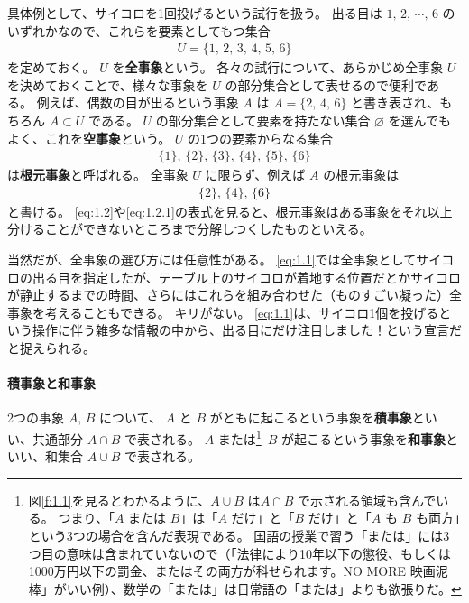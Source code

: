 \documentclass[12pt]{ltjsarticle}\usepackage{ifthen}\newcounter{enlarge}\setcounter{enlarge}{1}
\begin{document}
具体例として、サイコロを1回投げるという試行を扱う。
出る目は $1,\, 2,\, \cdots ,\, 6$ のいずれかなので、これらを要素としてもつ集合
\begin{align}
  U = \{ 1,\, 2,\, 3,\, 4,\, 5,\, 6 \} \label{eq:1.1}
\end{align}
を定めておく。
$U$ を\textbf{全事象}という。
各々の試行について、あらかじめ全事象 $U$ を決めておくことで、様々な事象を $U$ の部分集合として表せるので便利である。
例えば、偶数の目が出るという事象 $A$ は $A = \{ 2,\, 4,\, 6 \}$ と書き表され、もちろん $A \subset U$ である。
$U$ の部分集合として要素を持たない集合 $\varnothing$ を選んでもよく、これを\textbf{空事象}という。
$U$ の1つの要素からなる集合
\begin{align}
  \{ 1\},\, \{2\},\, \{3\},\, \{4\},\, \{5\},\, \{6\} \label{eq:1.2}
\end{align}
は\textbf{根元事象}と呼ばれる。
全事象 $U$ に限らず、例えば $A$ の根元事象は
\begin{align}
  \{2\},\, \{4\},\, \{6\} \label{eq:1.2.1}
\end{align}
と書ける。
\eqref{eq:1.2}や\eqref{eq:1.2.1}の表式を見ると、根元事象はある事象をそれ以上分けることができないところまで分解しつくしたものといえる。

当然だが、全事象の選び方には任意性がある。
\eqref{eq:1.1}では全事象としてサイコロの出る目を指定したが、テーブル上のサイコロが着地する位置だとかサイコロが静止するまでの時間、さらにはこれらを組み合わせた（ものすごい凝った）全事象を考えることもできる。
キリがない。
\eqref{eq:1.1}は、サイコロ1個を投げるという操作に伴う雑多な情報の中から、出る目にだけ注目しました！という宣言だと捉えられる。

\paragraph{積事象と和事象}

2つの事象 $A,\, B$ について、 $A$ と $B$ がともに起こるという事象を\textbf{積事象}といい、共通部分 $A \cap B$ で表される。
$A$ または\footnote{%
  図\ref{f:1.1}を見るとわかるように、$A \cup B$ は$A \cap B$ で示される領域も含んでいる。
  つまり、「$A$ または $B$」は「$A$ だけ」と「$B$ だけ」と「$A$ も $B$ も両方」という3つの場合を含んだ表現である。
  国語の授業で習う「または」には3つ目の意味は含まれていないので（「法律により10年以下の懲役、もしくは1000万円以下の罰金、またはその両方が科せられます。NO MORE 映画泥棒」がいい例）、数学の「または」は日常語の「または」よりも欲張りだ。
}\
$B$ が起こるという事象を\textbf{和事象}といい、和集合 $A \cup B$ で表される。
\end{document}
